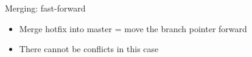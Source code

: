 \documentclass{beamer}
\begin{document}
\begin{frame}[b]{Merging: fast-forward}
  \begin{center}
  \end{center}
  \begin{itemize}
  \item Merge hotfix into master = move the branch pointer forward
  \item There cannot be conflicts in this case
  \end{itemize}
\end{frame}
\end{document}
